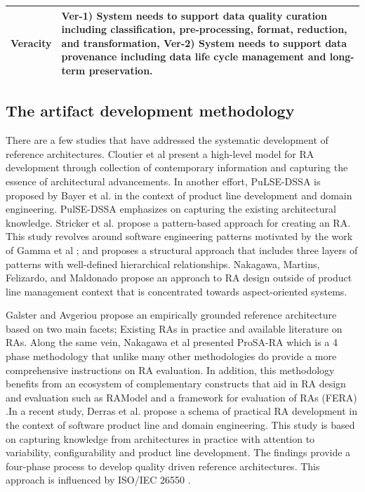 \documentclass[review]{elsarticle}
\begin{document}
\begin{table}
    \centering
    \renewcommand*{\arraystretch}{1.4}
    \begin{tabular}{|m{1.2cm}|m{10.5cm}|}
        
        \hline

        Veracity &
                
        \textbf{Ver-1)} System needs to support data quality curation including classification, pre-processing, format, reduction, and  transformation, \textbf{Ver-2)} System needs to support data provenance including data life cycle management and long-term preservation.
        \\
        \hline

\end{tabular}
\end{table}


\subsection{The artifact development methodology}


There are a few studies that have addressed the systematic development of reference architectures. Cloutier et al \cite{Cloutier} present a high-level model for RA development through collection of contemporary information and capturing the essence of architectural advancements. In another effort, PuLSE-DSSA is proposed by Bayer et al. \cite{bayer2004definition} in the context of product line development and domain engineering. PulSE-DSSA emphasizes on capturing the existing architectural knowledge. Stricker et al. \cite{stricker2010creating} propose a pattern-based approach for creating an RA. This study revolves around software engineering patterns motivated by the work of Gamma et al  \cite{gamma1995design}; and proposes a structural approach that includes three layers of patterns with well-defined hierarchical relationships. Nakagawa, Martins, Felizardo, and Maldonado \cite{nakagawa2009towards} propose an approach to RA design outside of product line management context that is concentrated towards aspect-oriented systems.

Galster and Avgeriou \cite{galster2011empirically} propose an empirically grounded reference architecture based on two main facets; Existing RAs in practice and available literature on RAs. Along the same vein, Nakagawa et al \cite{nakagawa2014consolidating} presented ProSA-RA which is a 4 phase methodology that unlike many other methodologies do provide a more comprehensive instructions on RA evaluation. In addition, this methodology benefits from an ecosystem of complementary constructs that aid in RA design and evaluation such as RAModel \cite{nakagawa2012ramodel} and a framework for evaluation of RAs (FERA) \cite{santos2013checklist}.In a recent study, Derras et al. \cite{derras2018reference} propose a schema of practical RA development in the context of software product line and domain engineering. This study is based on capturing knowledge from architectures in practice with attention to variability, configurability and product line development. The findings provide a four-phase process to develop quality driven reference architectures. This approach is influenced by ISO/IEC 26550 \cite{wg2015iso}.
\end{document}
